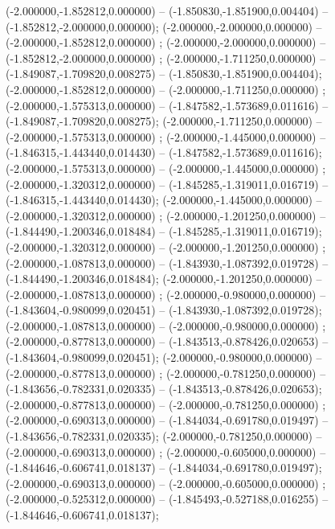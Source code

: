  (-2.000000,-1.852812,0.000000) -- (-1.850830,-1.851900,0.004404) -- (-1.852812,-2.000000,0.000000);
 (-2.000000,-2.000000,0.000000) -- (-2.000000,-1.852812,0.000000) ;
 (-2.000000,-2.000000,0.000000) -- (-1.852812,-2.000000,0.000000) ;
 (-2.000000,-1.711250,0.000000) -- (-1.849087,-1.709820,0.008275) -- (-1.850830,-1.851900,0.004404);
 (-2.000000,-1.852812,0.000000) -- (-2.000000,-1.711250,0.000000) ;
 (-2.000000,-1.575313,0.000000) -- (-1.847582,-1.573689,0.011616) -- (-1.849087,-1.709820,0.008275);
 (-2.000000,-1.711250,0.000000) -- (-2.000000,-1.575313,0.000000) ;
 (-2.000000,-1.445000,0.000000) -- (-1.846315,-1.443440,0.014430) -- (-1.847582,-1.573689,0.011616);
 (-2.000000,-1.575313,0.000000) -- (-2.000000,-1.445000,0.000000) ;
 (-2.000000,-1.320312,0.000000) -- (-1.845285,-1.319011,0.016719) -- (-1.846315,-1.443440,0.014430);
 (-2.000000,-1.445000,0.000000) -- (-2.000000,-1.320312,0.000000) ;
 (-2.000000,-1.201250,0.000000) -- (-1.844490,-1.200346,0.018484) -- (-1.845285,-1.319011,0.016719);
 (-2.000000,-1.320312,0.000000) -- (-2.000000,-1.201250,0.000000) ;
 (-2.000000,-1.087813,0.000000) -- (-1.843930,-1.087392,0.019728) -- (-1.844490,-1.200346,0.018484);
 (-2.000000,-1.201250,0.000000) -- (-2.000000,-1.087813,0.000000) ;
 (-2.000000,-0.980000,0.000000) -- (-1.843604,-0.980099,0.020451) -- (-1.843930,-1.087392,0.019728);
 (-2.000000,-1.087813,0.000000) -- (-2.000000,-0.980000,0.000000) ;
 (-2.000000,-0.877813,0.000000) -- (-1.843513,-0.878426,0.020653) -- (-1.843604,-0.980099,0.020451);
 (-2.000000,-0.980000,0.000000) -- (-2.000000,-0.877813,0.000000) ;
 (-2.000000,-0.781250,0.000000) -- (-1.843656,-0.782331,0.020335) -- (-1.843513,-0.878426,0.020653);
 (-2.000000,-0.877813,0.000000) -- (-2.000000,-0.781250,0.000000) ;
 (-2.000000,-0.690313,0.000000) -- (-1.844034,-0.691780,0.019497) -- (-1.843656,-0.782331,0.020335);
 (-2.000000,-0.781250,0.000000) -- (-2.000000,-0.690313,0.000000) ;
 (-2.000000,-0.605000,0.000000) -- (-1.844646,-0.606741,0.018137) -- (-1.844034,-0.691780,0.019497);
 (-2.000000,-0.690313,0.000000) -- (-2.000000,-0.605000,0.000000) ;
 (-2.000000,-0.525312,0.000000) -- (-1.845493,-0.527188,0.016255) -- (-1.844646,-0.606741,0.018137);
